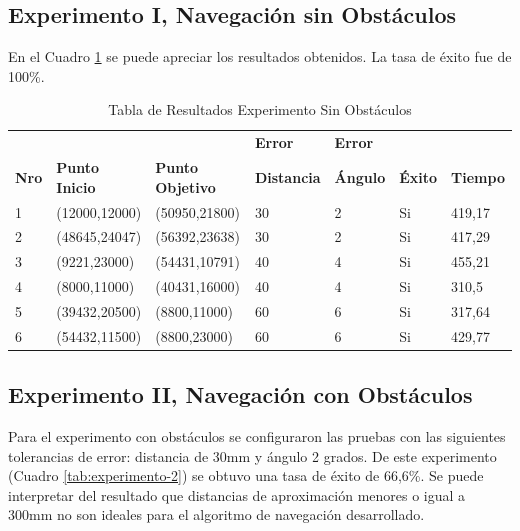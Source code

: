 \documentclass[11pt,twoside,A5]{article}
\newcommand{\reftable}[1]{Cuadro \ref{#1}}
\begin{document}
\subsection*{Experimento I, Navegación sin Obstáculos}

En el \reftable{tab:experimento-1} se puede apreciar los resultados obtenidos. 
La tasa de éxito fue de 100\%.

\begin{table}[h]
\centering
\caption{Tabla de Resultados Experimento Sin Obstáculos}
\label{tab:experimento-1}
\tiny
\begin{tabular}{|l|l|l|l|l|l|l|} \hline
&&&\textbf{Error}&\textbf{Error}&& \\ 
\textbf{Nro}&	\textbf{Punto Inicio}	& \textbf{Punto Objetivo} &	\textbf{Distancia}	& \textbf{Ángulo} &	\textbf{Éxito} &	\textbf{Tiempo} \\ \hline
1&(12000,12000)&(50950,21800)&30&2&Si&419,17 \\ \hline
2&(48645,24047)&(56392,23638)&30&2&Si&417,29 \\ \hline
3&(9221,23000)&(54431,10791)&40&4&Si&455,21 \\ \hline
4&(8000,11000)&(40431,16000)&40&4&Si&310,5  \\ \hline
5&(39432,20500)&(8800,11000)&60&6&Si&317,64 \\ \hline
6&(54432,11500)&(8800,23000)&60&6&Si&429,77 \\ \hline
\end{tabular}
\end{table}

\subsection*{Experimento II, Navegación con Obstáculos}

Para el experimento con obstáculos se configuraron las pruebas con 
las siguientes tolerancias de error: distancia de 30mm y ángulo 2 grados.
De este experimento (\reftable{tab:experimento-2}) se obtuvo una tasa de éxito de 66,6\%. Se puede interpretar del resultado
que distancias de aproximación menores o igual a 300mm no son ideales para el algoritmo de navegación desarrollado.
\end{document}
